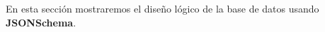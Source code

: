 En esta sección mostraremos el diseño lógico de la base de datos usando \textbf{JSONSchema}.










